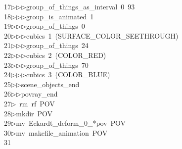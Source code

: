 \begin{tabbing}
17\>$\triangleright$\>$\triangleright$\>$\triangleright$\>group\_of\_things\_as\_interval\ 0\ 93\ \\[0pt]
18\>$\triangleright$\>$\triangleright$\>$\triangleright$\>group\_is\_animated\ 1\ \\[0pt]
19\>$\triangleright$\>$\triangleright$\>$\triangleright$\>group\_of\_things\ 0\ \\[0pt]
20\>$\triangleright$\>$\triangleright$\>$\triangleright$\>cubics\ 1\ (SURFACE\_COLOR\_SEETHROUGH)\ \\[0pt]
21\>$\triangleright$\>$\triangleright$\>$\triangleright$\>group\_of\_things\ 24\ \\[0pt]
22\>$\triangleright$\>$\triangleright$\>$\triangleright$\>cubics\ 2\ (COLOR\_RED)\ \\[0pt]
23\>$\triangleright$\>$\triangleright$\>$\triangleright$\>group\_of\_things\ 70\ \\[0pt]
24\>$\triangleright$\>$\triangleright$\>$\triangleright$\>cubics\ 3\ (COLOR\_BLUE)\ \\[0pt]
25\>$\triangleright$\>$\triangleright$\>scene\_objects\_end\ \\[0pt]
26\>$\triangleright$\>$\triangleright$\>povray\_end\\[0pt]
27\>$\triangleright$\>\ rm\ rf\ POV\\[0pt]
28\>$\triangleright$\>mkdir\ POV\\[0pt]
29\>$\triangleright$\>mv\ Eckardt\_deform\_0\_*pov\ POV\\[0pt]
30\>$\triangleright$\>mv\ makefile\_animation\ POV\\[0pt]
31\>\end{tabbing}
